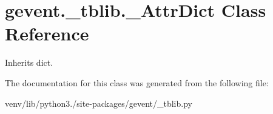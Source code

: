 \hypertarget{classgevent_1_1__tblib_1_1___attr_dict}{}\section{gevent.\+\_\+tblib.\+\_\+\+Attr\+Dict Class Reference}
\label{classgevent_1_1__tblib_1_1___attr_dict}


Inherits dict.



The documentation for this class was generated from the following file\+:\begin{DoxyCompactItemize}
\item 
venv/lib/python3./site-\/packages/gevent/\+\_\+tblib.\+py\end{DoxyCompactItemize}
